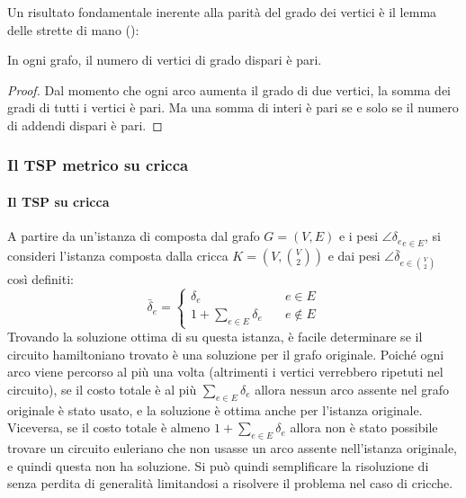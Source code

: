 Un risultato fondamentale inerente alla parità del grado dei vertici è il lemma delle strette di mano ():
\begin{lemma}\label{lem:handshaking}
	In ogni grafo, il numero di vertici di grado dispari è pari.
\end{lemma}
\begin{proof}
	Dal momento che ogni arco aumenta il grado di due vertici, la somma dei gradi di tutti i vertici è pari. Ma una somma di interi è pari se e solo se il numero di addendi dispari è pari.
\end{proof}

\subsubsection{Il TSP metrico su cricca}\label{subsub:tsp:criccametrica}

\paragraph{Il TSP su cricca} A partire da un'istanza di \TravelingSalesman composta dal grafo $G=(V,E)$ e i pesi $\angle{\delta_e}_{e\in E}$, si consideri l'istanza composta dalla cricca $K=\left(V,\binom V 2\right)$ e dai pesi $\angle{\bar\delta}_{e\in\binom V 2}$ così definiti:
\begin{equation*}
	\bar\delta_e = \begin{cases}
		\delta_e                 & \quad e \in E    \\
		1+\sum_{e\in E} \delta_e & \quad e \notin E
	\end{cases}
\end{equation*}
Trovando la soluzione ottima di \TravelingSalesman su questa istanza, è facile determinare se il circuito hamiltoniano trovato è una soluzione per il grafo originale.
Poiché ogni arco viene percorso al più una volta (altrimenti i vertici verrebbero ripetuti nel circuito), se il costo totale è al più $\sum_{e\in E} \delta_e$ allora nessun arco assente nel grafo originale è stato usato, e la soluzione è ottima anche per l'istanza originale.
Viceversa, se il costo totale è almeno $1+\sum_{e\in E} \delta_e$ allora non è stato possibile trovare un circuito euleriano che non usasse un arco assente nell'istanza originale, e quindi questa non ha soluzione.
Si può quindi semplificare la risoluzione di \TravelingSalesman senza perdita di generalità limitandosi a risolvere il problema nel caso di cricche.

